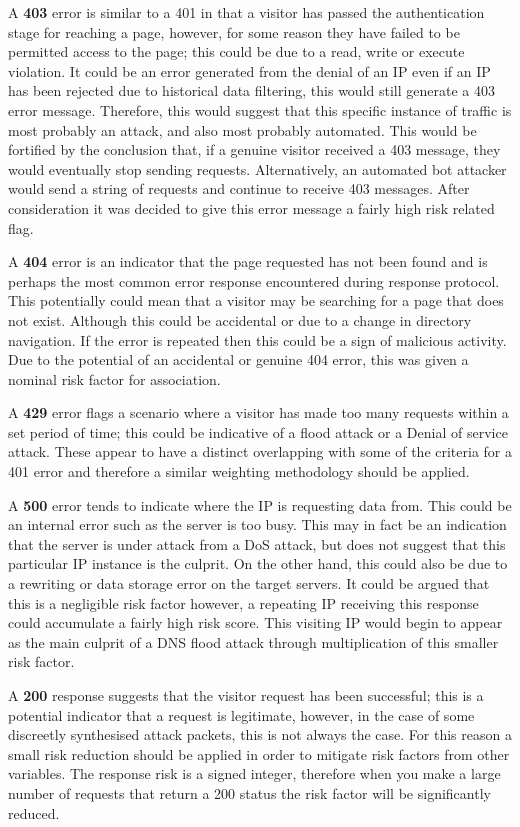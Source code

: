 A \textbf{403} error is similar to a 401 in that a visitor has passed the authentication stage for reaching a page, however, for some reason they have failed to be permitted access to the page; this could be due to a read, write or execute violation. It could be an error generated from the denial of an IP even if an IP has been rejected due to historical data filtering, this would still generate a 403 error message. Therefore, this would suggest that this specific instance of traffic is most probably an attack, and also most probably automated. This would be fortified by the conclusion that, if a genuine visitor received a 403 message, they would eventually stop sending requests. Alternatively, an automated bot attacker would send a string of requests and continue to receive 403 messages. After consideration it was decided to give this error message a fairly high risk related flag.


A \textbf{404} error is an indicator that the page requested has not been found and is perhaps the most common error response encountered during response protocol. This potentially could mean that a visitor may be searching for a page that does not exist. Although this could be accidental or due to a change in directory navigation. If the error is repeated then this could be a sign of malicious activity. Due to the potential of an accidental or genuine 404 error, this was given a nominal risk factor for association.

A \textbf{429} error flags a scenario where a visitor has made too many requests within a set period of time; this could be indicative of a flood attack or a Denial of service attack. These appear to have a distinct overlapping with some of the criteria for a 401 error and therefore a similar weighting methodology should be applied. 


A \textbf{500} error tends to indicate where the IP is requesting data from. This could be an internal error such as the server is too busy. This may in fact be an indication that the server is under attack from a DoS attack, but does not suggest that this particular IP instance is the culprit. On the other hand, this could also be due to a rewriting or data storage error on the target servers. It could be argued that this is a negligible risk factor however, a repeating IP receiving this response could accumulate a fairly high risk score. This visiting IP would begin to appear as the main culprit of a DNS flood attack through multiplication of this smaller risk factor.

A \textbf{200} response suggests that the visitor request has been successful; this is a potential indicator that a request is legitimate, however, in the case of some discreetly synthesised attack packets, this is not always the case. For this reason a small risk reduction should be applied in order to mitigate risk factors from other variables. The response risk is a signed integer, therefore when you make a large number of requests that return a 200 status the risk factor will be significantly reduced.




